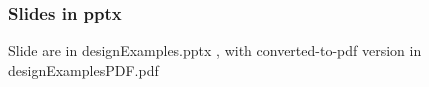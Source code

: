 \begin{frame}
\frametitle{Slides in pptx}

Slide are in designExamples.pptx , with converted-to-pdf
  version in designExamplesPDF.pdf
\end{frame}
